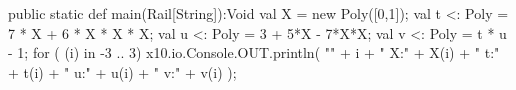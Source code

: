 %   
% 
\begin{xten}
  public static def main(Rail[String]):Void {
     val X = new Poly([0,1]);
     val t <: Poly = 7 * X + 6 * X * X * X; 
     val u <: Poly = 3 + 5*X - 7*X*X;
     val v <: Poly = t * u - 1;
     for ( (i) in -3 .. 3) {
       x10.io.Console.OUT.println(
         "" + i + "	X:" + X(i) + "	t:" + t(i) 
         + "	u:" + u(i) + "	v:" + v(i)
         );
     }
  }

\end{xten}

